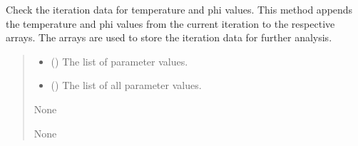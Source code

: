 \documentclass[a4paper,11pt,english,openany]{sphinxmanual}
\begin{document}
\begin{fulllineitems}
\begin{fulllineitems}
\label{\detokenize{api/spyice.models.sea_ice_model:src.spyice.models.sea_ice_model.SeaIceModel.check_and_reset_any_iteration_data}}
\pysigstartsignatures
\pysiglinewithargsret
{}
{\sphinxparamcomma {}}
{}
\pysigstopsignatures
\sphinxAtStartPar
Check the iteration data for temperature and phi values.
This method appends the temperature and phi values from the current iteration to the respective arrays.
The arrays are used to store the iteration data for further analysis.
\begin{quote}\begin{description}
\begin{itemize}
\item {} 
\sphinxAtStartPar
{} () \textendash{} The list of parameter values.

\item {} 
\sphinxAtStartPar
{} () \textendash{} The list of all parameter values.

\end{itemize}

\sphinxAtStartPar
None

\sphinxAtStartPar
None

\end{description}\end{quote}

\end{fulllineitems}


\begin{fulllineitems}
\label{\detokenize{api/spyice.models.sea_ice_model:src.spyice.models.sea_ice_model.SeaIceModel.check_convergence}}
\pysigstartsignatures
\pysiglinewithargsret
{}
{\sphinxparamcomma {}\sphinxparamcomma {}\sphinxparamcomma {}\sphinxparamcomma {}\sphinxparamcomma {}\sphinxparamcomma {}\sphinxparamcomma {}\sphinxparamcomma {}\sphinxparamcomma {}\sphinxparamcomma {}\sphinxparamcomma {}\sphinxparamcomma {}}
{}
\pysigstopsignatures
\end{fulllineitems}


\end{fulllineitems}
\end{document}
